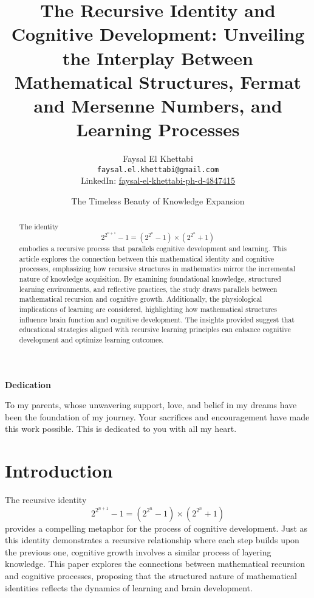 \documentclass{article}
\title{The Recursive Identity and Cognitive Development: Unveiling the Interplay Between Mathematical Structures, Fermat and Mersenne Numbers, and Learning Processes}
\author{Faysal El Khettabi \\
\texttt{faysal.el.khettabi@gmail.com} \\
LinkedIn: \href{https://www.linkedin.com/in/faysal-el-khettabi-ph-d-4847415/}{faysal-el-khettabi-ph-d-4847415}}
\date{The Timeless Beauty of Knowledge Expansion}
\begin{document}
\maketitle
\begin{center}
    \textbf{Dedication}
\end{center}

To my parents, whose unwavering support, love, and belief in my dreams have been the foundation of my journey. Your sacrifices and encouragement have made this work possible. This is dedicated to you with all my heart.






\begin{abstract}
The identity 
\[
2^{2^{n + 1}} - 1 = (2^{2^n} - 1) \times (2^{2^n} + 1)
\]
embodies a recursive process that parallels cognitive development and learning. This article explores the connection between this mathematical identity and cognitive processes, emphasizing how recursive structures in mathematics mirror the incremental nature of knowledge acquisition. By examining foundational knowledge, structured learning environments, and reflective practices, the study draws parallels between mathematical recursion and cognitive growth. Additionally, the physiological implications of learning are considered, highlighting how mathematical structures influence brain function and cognitive development. The insights provided suggest that educational strategies aligned with recursive learning principles can enhance cognitive development and optimize learning outcomes.
\end{abstract}

\section{Introduction}

The recursive identity 
\[
2^{2^{n + 1}} - 1 = (2^{2^n} - 1) \times (2^{2^n} + 1)
\]
provides a compelling metaphor for the process of cognitive development. Just as this identity demonstrates a recursive relationship where each step builds upon the previous one, cognitive growth involves a similar process of layering knowledge. This paper explores the connections between mathematical recursion and cognitive processes, proposing that the structured nature of mathematical identities reflects the dynamics of learning and brain development.
\end{document}
